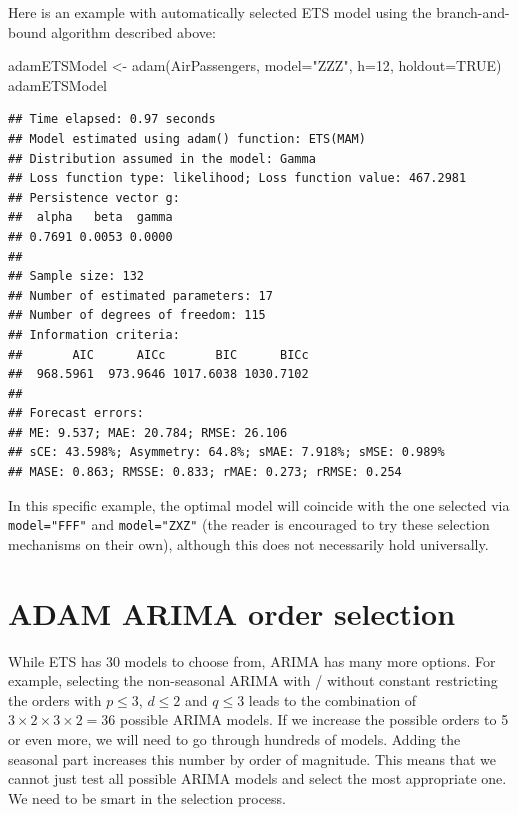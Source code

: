 \documentclass[
]{book}
\newenvironment{Shaded}{\begin{snugshade}}{\end{snugshade}}
\newcommand{\AttributeTok}[1]{\textcolor[rgb]{0.77,0.63,0.00}{#1}}
\newcommand{\ConstantTok}[1]{\textcolor[rgb]{0.00,0.00,0.00}{#1}}
\newcommand{\DecValTok}[1]{\textcolor[rgb]{0.00,0.00,0.81}{#1}}
\newcommand{\FunctionTok}[1]{\textcolor[rgb]{0.00,0.00,0.00}{#1}}
\newcommand{\NormalTok}[1]{#1}
\newcommand{\OtherTok}[1]{\textcolor[rgb]{0.56,0.35,0.01}{#1}}
\newcommand{\StringTok}[1]{\textcolor[rgb]{0.31,0.60,0.02}{#1}}
\theoremstyle{definition}
\theoremstyle{definition}
\theoremstyle{definition}
\theoremstyle{definition}
\theoremstyle{remark}
\begin{document}
Here is an example with automatically selected ETS model using the branch-and-bound algorithm described above:

\begin{Shaded}
\begin{Highlighting}[]
\NormalTok{adamETSModel }\OtherTok{\textless{}{-}} \FunctionTok{adam}\NormalTok{(AirPassengers, }\AttributeTok{model=}\StringTok{"ZZZ"}\NormalTok{, }\AttributeTok{h=}\DecValTok{12}\NormalTok{, }\AttributeTok{holdout=}\ConstantTok{TRUE}\NormalTok{)}
\NormalTok{adamETSModel}
\end{Highlighting}
\end{Shaded}

\begin{verbatim}
## Time elapsed: 0.97 seconds
## Model estimated using adam() function: ETS(MAM)
## Distribution assumed in the model: Gamma
## Loss function type: likelihood; Loss function value: 467.2981
## Persistence vector g:
##  alpha   beta  gamma 
## 0.7691 0.0053 0.0000 
## 
## Sample size: 132
## Number of estimated parameters: 17
## Number of degrees of freedom: 115
## Information criteria:
##       AIC      AICc       BIC      BICc 
##  968.5961  973.9646 1017.6038 1030.7102 
## 
## Forecast errors:
## ME: 9.537; MAE: 20.784; RMSE: 26.106
## sCE: 43.598%; Asymmetry: 64.8%; sMAE: 7.918%; sMSE: 0.989%
## MASE: 0.863; RMSSE: 0.833; rMAE: 0.273; rRMSE: 0.254
\end{verbatim}

In this specific example, the optimal model will coincide with the one selected via \texttt{model="FFF"} and \texttt{model="ZXZ"} (the reader is encouraged to try these selection mechanisms on their own), although this does not necessarily hold universally.

\hypertarget{ARIMASelection}{%
\section{ADAM ARIMA order selection}\label{ARIMASelection}}

While ETS has 30 models to choose from, ARIMA has many more options. For example, selecting the non-seasonal ARIMA with / without constant restricting the orders with \(p \leq 3\), \(d \leq 2\) and \(q \leq 3\) leads to the combination of \(3 \times 2 \times 3 \times 2 = 36\) possible ARIMA models. If we increase the possible orders to 5 or even more, we will need to go through hundreds of models. Adding the seasonal part increases this number by order of magnitude. This means that we cannot just test all possible ARIMA models and select the most appropriate one. We need to be smart in the selection process.
\end{document}
